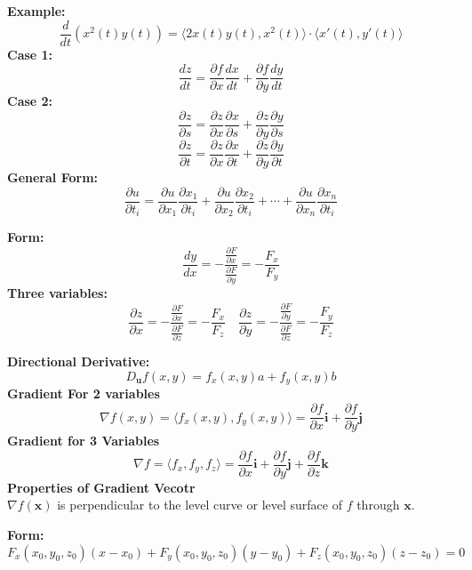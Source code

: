 \documentclass[2pt]{article}
\begin{document}
\begin{multicols}{2}
\begin{tcolorbox}[title=\textbf{Chain Rule}, colframe=lightblue]
    \textbf{Example:}
    \[ \frac{d}{dt} \left( x^2(t) y(t) \right) = \langle 2x(t) y(t), x^2(t) \rangle \cdot \langle x'(t), y'(t) \rangle \] 
    \textbf{Case 1:} 	
    \[ \frac{dz}{dt} = \frac{\partial f}{\partial x} \frac{dx}{dt} + \frac{\partial f}{\partial y} \frac{dy}{dt} \]
    \textbf{Case 2:}
    \[ \frac{\partial z}{\partial s} = \frac{\partial z}{\partial x} \frac{\partial x}{\partial s} + \frac{\partial z}{\partial y} \frac{\partial y}{\partial s} \]
    \[ \frac{\partial z}{\partial t} = \frac{\partial z}{\partial x} \frac{\partial x}{\partial t} + \frac{\partial z}{\partial y} \frac{\partial y}{\partial t} \]
    \textbf{General Form:}
    \[ \frac{\partial u}{\partial t_i} = \frac{\partial u}{\partial x_1} \frac{\partial x_1}{\partial t_i} + \frac{\partial u}{\partial x_2} \frac{\partial x_2}{\partial t_i} + \cdots + \frac{\partial u}{\partial x_n} \frac{\partial x_n}{\partial t_i} \]
\end{tcolorbox}

\begin{tcolorbox}[title=\textbf{Implicit Differentiation}, colframe=lightblue]
    \textbf{Form:} 	
    \[ \frac{dy}{dx} = -\frac{\frac{\partial F}{\partial x}}{\frac{\partial F}{\partial y}} = -\frac{F_x}{F_y} \]
    \textbf{Three variables:}
    \[ \frac{\partial z}{\partial x} = -\frac{\frac{\partial F}{\partial x}}{\frac{\partial F}{\partial z}} = -\frac{F_x}{F_z} \quad \frac{\partial z}{\partial y} = -\frac{\frac{\partial F}{\partial y}}{\frac{\partial F}{\partial z}} = -\frac{F_y}{F_z} \]
\end{tcolorbox}

\begin{tcolorbox}[title=\textbf{Directional Derivative and Gradient Vector}, colframe=lightblue]
    \textbf{Directional Derivative:} 	
    \[ D_{\mathbf{u}} f(x, y) = f_x(x, y) a + f_y(x, y) b \] 
    \textbf{Gradient For 2 variables}
    \[ \nabla f(x, y) = \langle f_x(x, y), f_y(x, y) \rangle = \frac{\partial f}{\partial x} \mathbf{i} + \frac{\partial f}{\partial y} \mathbf{j} \]
    \textbf{Gradient for 3 Variables} 
    \[ \nabla f = \langle f_x, f_y, f_z \rangle = \frac{\partial f}{\partial x} \mathbf{i} + \frac{\partial f}{\partial y} \mathbf{j} + \frac{\partial f}{\partial z} \mathbf{k} \] 
    \textbf{Properties of Gradient Vecotr} \\
    \( \nabla f(\mathbf{x}) \) is perpendicular to the level curve or level surface of \( f \) through \( \mathbf{x} \). \\

\end{tcolorbox}

\begin{tcolorbox}[title=\textbf{Tangent Planes and Surfaces}, colframe=lightblue]
    \textbf{Form:} 	
    \[ \scriptstyle F_x(x_0, y_0, z_0)(x - x_0) + F_y(x_0, y_0, z_0)(y - y_0) + F_z(x_0, y_0, z_0)(z - z_0) = 0  \]
\end{tcolorbox}

\end{multicols}
\end{document}
